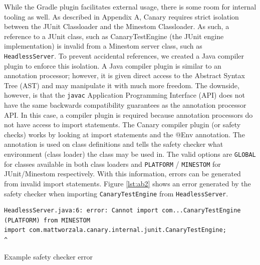 \documentclass[12pt]{article}
\def\code#1{\texttt{#1}}
\begin{document}
\begin{onehalfspacing}











While the Gradle plugin facilitates external usage, there is some room
for internal tooling as well. As described in Appendix A, Canary
requires strict isolation between the JUnit Classloader and the Minestom
Classloader. As such, a reference to a JUnit class, such as
CanaryTestEngine (the JUnit engine implementation) is invalid from a
Minestom server class, such as \code{HeadlessServer}. To prevent accidental
references, we created a Java compiler plugin to enforce this isolation.
A Java compiler plugin is similar to an annotation processor; however,
it is given direct access to the Abstract Syntax Tree (AST) and may
manipulate it with much more freedom. The downside, however, is that the
\code{javac} Application Programming Interface (API) does not have the same
backwards compatibility guarantees as the annotation processor API. In
this case, a compiler plugin is required because annotation processors
do not have access to import statements. The Canary compiler plugin (or
safety checks) works by looking at import statements and the @Env
annotation. The annotation is used on class definitions and tells the
safety checker what environment (class loader) the class may be used in.
The valid options are \code{GLOBAL} for classes available in both class loaders
and \code{PLATFORM} / \code{MINESTOM} for JUnit/Minestom respectively. With this
information, errors can be generated from invalid import statements.
Figure \ref{lst:ab2} shows an error generated by the safety checker when
importing \code{CanaryTestEngine} from \code{HeadlessServer}.

\begin{listing}[H]
\begin{verbatim}
HeadlessServer.java:6: error: Cannot import com...CanaryTestEngine (PLATFORM) from MINESTOM
import com.mattworzala.canary.internal.junit.CanaryTestEngine;
^
\end{verbatim}
\caption{Example safety checker error}
\label{lst:ab2}
\end{listing}






\end{onehalfspacing} %
\end{document}
